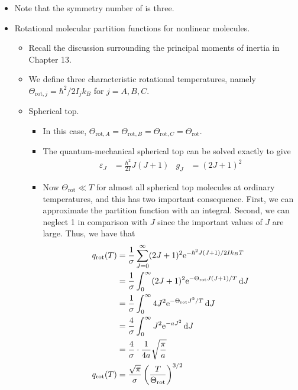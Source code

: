 \documentclass[../notes.tex]{subfiles}
\begin{document}
\begin{itemize}
\begin{itemize}
    \end{itemize}
    \item Note that the symmetry number of  is three.
    \item Rotational molecular partition functions for nonlinear molecules.
    \begin{itemize}
        \item Recall the discussion surrounding the principal moments of inertia in Chapter 13.
        \item We define three characteristic rotational temperatures, namely $\Theta_{\text{rot},j}=\hbar^2/2I_jk_B$ for $j=A,B,C$.
        \item Spherical top.
        \begin{itemize}
            \item In this case, $\Theta_{\text{rot},A}=\Theta_{\text{rot},B}=\Theta_{\text{rot},C}=\Theta_\text{rot}$.
            \item The quantum-mechanical spherical top can be solved exactly to give
            \begin{align*}
                \varepsilon_J &= \frac{\hbar^2}{2I}J(J+1)&
                g_J &= (2J+1)^2
            \end{align*}
            \item Now $\Theta_\text{rot}\ll T$ for almost all spherical top molecules at ordinary temperatures, and this has two important consequence. First, we can approximate the partition function with an integral. Second, we can neglect 1 in comparison with $J$ since the important values of $J$ are large. Thus, we have that
            \begingroup
            \allowdisplaybreaks
            \begin{align*}
                q_\text{rot}(T) &= \frac{1}{\sigma}\sum_{J=0}^\infty(2J+1)^2\e[-\hbar^2J(J+1)/2Ik_BT]\\
                &= \frac{1}{\sigma}\int_0^\infty(2J+1)^2\e[-\Theta_\text{rot}J(J+1)/T]\dd{J}\\
                &= \frac{1}{\sigma}\int_0^\infty 4J^2\e[-\Theta_\text{rot}J^2/T]\dd{J}\\
                &= \frac{4}{\sigma}\int_0^\infty J^2\e[-aJ^2]\dd{J}\\
                &= \frac{4}{\sigma}\cdot\frac{1}{4a}\sqrt{\frac{\pi}{a}}\\
                q_\text{rot}(T) &= \frac{\sqrt{\pi}}{\sigma}\left( \frac{T}{\Theta_\text{rot}} \right)^{3/2}
            \end{align*}
            \endgroup

\end{itemize}
\end{itemize}
\end{itemize}
\end{document}
